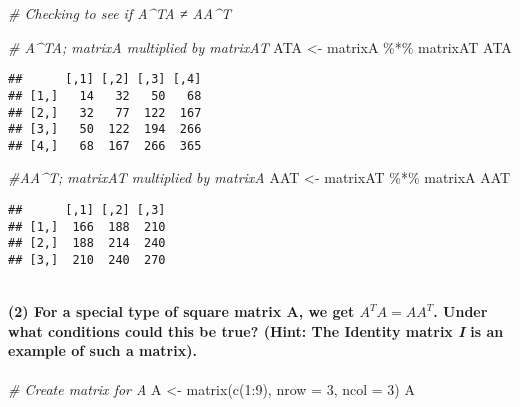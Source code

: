 \documentclass[
]{article}
\newenvironment{Shaded}{\begin{snugshade}}{\end{snugshade}}
\newcommand{\AttributeTok}[1]{\textcolor[rgb]{0.77,0.63,0.00}{#1}}
\newcommand{\CommentTok}[1]{\textcolor[rgb]{0.56,0.35,0.01}{\textit{#1}}}
\newcommand{\DecValTok}[1]{\textcolor[rgb]{0.00,0.00,0.81}{#1}}
\newcommand{\FunctionTok}[1]{\textcolor[rgb]{0.00,0.00,0.00}{#1}}
\newcommand{\NormalTok}[1]{#1}
\newcommand{\OtherTok}[1]{\textcolor[rgb]{0.56,0.35,0.01}{#1}}
\newcommand{\SpecialCharTok}[1]{\textcolor[rgb]{0.00,0.00,0.00}{#1}}
\begin{document}
\(~\)

\begin{Shaded}
\begin{Highlighting}[]
\CommentTok{\# Checking to see if A\^{}TA ≠ AA\^{}T}

\CommentTok{\# A\^{}TA; matrixA multiplied by matrixAT}
\NormalTok{ATA }\OtherTok{\textless{}{-}}\NormalTok{ matrixA }\SpecialCharTok{\%*\%}\NormalTok{ matrixAT}
\NormalTok{ATA}
\end{Highlighting}
\end{Shaded}

\begin{verbatim}
##      [,1] [,2] [,3] [,4]
## [1,]   14   32   50   68
## [2,]   32   77  122  167
## [3,]   50  122  194  266
## [4,]   68  167  266  365
\end{verbatim}

\begin{Shaded}
\begin{Highlighting}[]
\CommentTok{\#AA\^{}T; matrixAT multiplied by matrixA}
\NormalTok{AAT }\OtherTok{\textless{}{-}}\NormalTok{ matrixAT }\SpecialCharTok{\%*\%}\NormalTok{ matrixA}
\NormalTok{AAT}
\end{Highlighting}
\end{Shaded}

\begin{verbatim}
##      [,1] [,2] [,3]
## [1,]  166  188  210
## [2,]  188  214  240
## [3,]  210  240  270
\end{verbatim}

\(~\)

\hypertarget{for-a-special-type-of-square-matrix-a-we-get-ata-aat.-under-what-conditions-could-this-be-true-hint-the-identity-matrix-i-is-an-example-of-such-a-matrix.}{%
\paragraph{\texorpdfstring{(2) For a special type of square matrix A, we
get \emph{\(A^TA = AA^T\)}. Under what conditions could this be true?
(Hint: The Identity matrix \emph{I} is an example of such a
matrix).}{(2) For a special type of square matrix A, we get A\^{}TA = AA\^{}T. Under what conditions could this be true? (Hint: The Identity matrix I is an example of such a matrix).}}\label{for-a-special-type-of-square-matrix-a-we-get-ata-aat.-under-what-conditions-could-this-be-true-hint-the-identity-matrix-i-is-an-example-of-such-a-matrix.}}

\begin{Shaded}
\begin{Highlighting}[]
\CommentTok{\# Create matrix for A}
\NormalTok{A }\OtherTok{\textless{}{-}} \FunctionTok{matrix}\NormalTok{(}\FunctionTok{c}\NormalTok{(}\DecValTok{1}\SpecialCharTok{:}\DecValTok{9}\NormalTok{), }\AttributeTok{nrow =} \DecValTok{3}\NormalTok{, }\AttributeTok{ncol =} \DecValTok{3}\NormalTok{)}
\NormalTok{A}
\end{Highlighting}
\end{Shaded}
\end{document}
